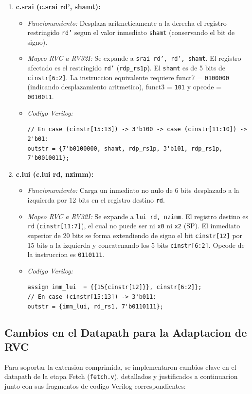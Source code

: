 \documentclass[12pt, a4paper]{article}
\begin{document}
\begin{enumerate}
    \item \textbf{c.srai (c.srai rd', shamt):}
    \begin{itemize}
        \item \textit{Funcionamiento:} Desplaza aritmeticamente a la derecha el registro restringido \texttt{rd'} segun el valor inmediato \texttt{shamt} (conservando el bit de signo).
        \item \textit{Mapeo RVC a RV32I:} Se expande a \texttt{srai rd', rd', shamt}. El registro afectado es el restringido \texttt{rd'} (\texttt{rdp\_rs1p}). El \texttt{shamt} es de 5 bits de \texttt{cinstr[6:2]}. La instruccion equivalente requiere funct7 = \texttt{0100000} (indicando desplazamiento aritmetico), funct3 = \texttt{101} y opcode = \texttt{0010011}.
        \item \textit{Codigo Verilog:}
        \begin{lstlisting}[style=verilogstyle]
// En case (cinstr[15:13]) -> 3'b100 -> case (cinstr[11:10]) -> 2'b01:
outstr = {7'b0100000, shamt, rdp_rs1p, 3'b101, rdp_rs1p, 7'b0010011};
        \end{lstlisting}
    \end{itemize}

    \item \textbf{c.lui (c.lui rd, nzimm):}
    \begin{itemize}
        \item \textit{Funcionamiento:} Carga un inmediato no nulo de 6 bits desplazado a la izquierda por 12 bits en el registro destino \texttt{rd}.
        \item \textit{Mapeo RVC a RV32I:} Se expande a \texttt{lui rd, nzimm}. El registro destino es \texttt{rd} (\texttt{cinstr[11:7]}), el cual no puede ser ni \texttt{x0} ni \texttt{x2} (SP). El inmediato superior de 20 bits se forma extendiendo de signo el bit \texttt{cinstr[12]} por 15 bits a la izquierda y concatenando los 5 bits \texttt{cinstr[6:2]}. Opcode de la instruccion es \texttt{0110111}.
        \item \textit{Codigo Verilog:}
        \begin{lstlisting}[style=verilogstyle]
assign imm_lui  = {{15{cinstr[12]}}, cinstr[6:2]};
// En case (cinstr[15:13]) -> 3'b011:
outstr = {imm_lui, rd_rs1, 7'b0110111};
        \end{lstlisting}
    \end{itemize}
\end{enumerate}

\subsection{Cambios en el Datapath para la Adaptacion de RVC}
Para soportar la extension comprimida, se implementaron cambios clave en el datapath de la etapa Fetch (\texttt{fetch.v}), detallados y justificados a continuacion junto con sus fragmentos de codigo Verilog correspondientes:
\end{document}
